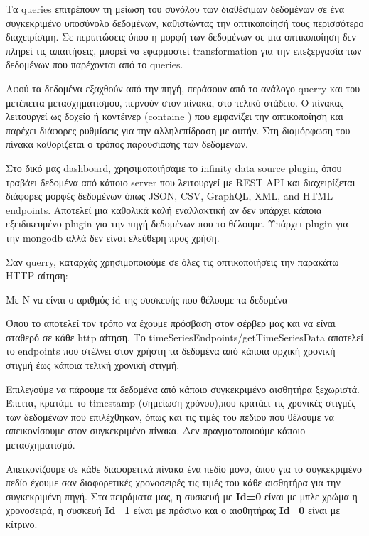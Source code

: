 Τα queries επιτρέπουν τη μείωση του συνόλου των διαθέσιμων δεδομένων σε ένα συγκεκριμένο υποσύνολο δεδομένων, καθιστώντας την οπτικοποίησή τους περισσότερο διαχειρίσιμη. 
Σε περιπτώσεις όπου η μορφή των δεδομένων σε μια οπτικοποίηση δεν πληρεί τις απαιτήσεις, μπορεί να εφαρμοστεί transformation για την επεξεργασία των δεδομένων που παρέχονται από το queries.

Αφού τα δεδομένα εξαχθούν από την πηγή, περάσουν από το ανάλογο querry και του μετέπειτα μετασχηματισμού, περνούν στον πίνακα, στο τελικό στάδειο. 
Ο πίνακας λειτουργεί ως δοχείο ή κοντέινερ (containe ) που εμφανίζει την οπτικοποίηση και παρέχει διάφορες ρυθμίσεις για την αλληλεπίδραση με αυτήν. 
Στη διαμόρφωση του πίνακα καθορίζεται ο τρόπος παρουσίασης των δεδομένων.

Στο δικό μας dashboard, χρησιμοποιήσαμε το infinity data source plugin,
όπου τραβάει δεδομένα από κάποιο server που λειτουργεί με REST API 
και διαχειρίζεται διάφορες μορφές δεδομένων όπως JSON, CSV, GraphQL, XML, and HTML endpoints.
Αποτελεί μια καθολικά καλή εναλλακτική αν δεν υπάρχει κάποια εξειδικευμένο plugin για την πηγή δεδομένων που το θέλουμε. Υπάρχει plugin για την mongodb αλλά δεν είναι ελεύθερη προς χρήση.

Σαν querry, καταρχάς χρησιμοποιούμε σε όλες τις οπτικοποιήσεις την παρακάτω HTTP αίτηση:

\begin{center}
\linebreak 
{}
\linebreak
Με N να είναι ο αριθμός id της συσκευής που θέλουμε τα δεδομένα
\end{center}

Όπου το \texttt{} αποτελεί τον τρόπο 
να έχουμε πρόσβαση στον σέρβερ μας και να είναι σταθερό σε κάθε http αίτηση.
Το timeSeriesEndpoints/getTimeSeriesData αποτελεί το endpoints 
που στέλνει στον χρήστη τα δεδομένα από κάποια αρχική χρονική στιγμή έως κάποια τελική χρονική στιγμή.

Επιλεγούμε να πάρουμε τα δεδομένα από κάποιο συγκεκριμένο αισθητήρα ξεχωριστά.
Έπειτα, κρατάμε το timestamp (σημείωση χρόνου),που κρατάει τις χρονικές στιγμές των δεδομένων που επιλέχθηκαν,
όπως και τις τιμές του πεδίου που θέλουμε να απεικονίσουμε στον συγκεκριμένο πίνακα.
Δεν πραγματοποιούμε κάποιο μετασχηματισμό.

Απεικονίζουμε σε κάθε διαφορετικά πίνακα ένα πεδίο μόνο, όπου για το συγκεκριμένο πεδίο έχουμε σαν διαφορετικές χρονοσειρές τις τιμές του κάθε αισθητήρα για την συγκεκριμένη πηγή.
Στα πειράματα μας, η συσκευή με \textbf{Id=0} είναι με μπλε χρώμα η χρονοσειρά,
η συσκευή  \textbf{Id=1} είναι με πράσινο και ο αισθητήρας \textbf{Id=0} είναι με κίτρινο.


